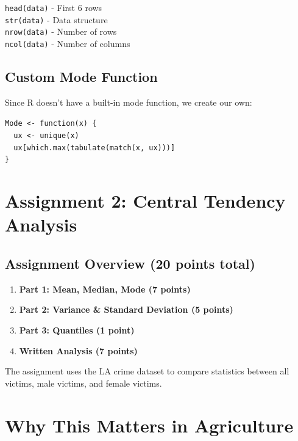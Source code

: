 \documentclass[11pt,a4paper]{article}
\begin{document}
\begin{infobox}
\texttt{head(data)} - First 6 rows\\
\texttt{str(data)} - Data structure\\
\texttt{nrow(data)} - Number of rows\\
\texttt{ncol(data)} - Number of columns
\end{infobox}

\subsection{Custom Mode Function}

Since R doesn't have a built-in mode function, we create our own:

\begin{infobox}
\texttt{Mode <- function(x) \{}\\
\texttt{~~ux <- unique(x)}\\
\texttt{~~ux[which.max(tabulate(match(x, ux)))]}\\
\texttt{\}}
\end{infobox}

\section{Assignment 2: Central Tendency Analysis}

\subsection{Assignment Overview (20 points total)}

\begin{enumerate}
    \item \textbf{Part 1: Mean, Median, Mode (7 points)}
    \item \textbf{Part 2: Variance \& Standard Deviation (5 points)}
    \item \textbf{Part 3: Quantiles (1 point)}
    \item \textbf{Written Analysis (7 points)}
\end{enumerate}

The assignment uses the LA crime dataset to compare statistics between all victims, male victims, and female victims.

\section{Why This Matters in Agriculture}
\end{document}
